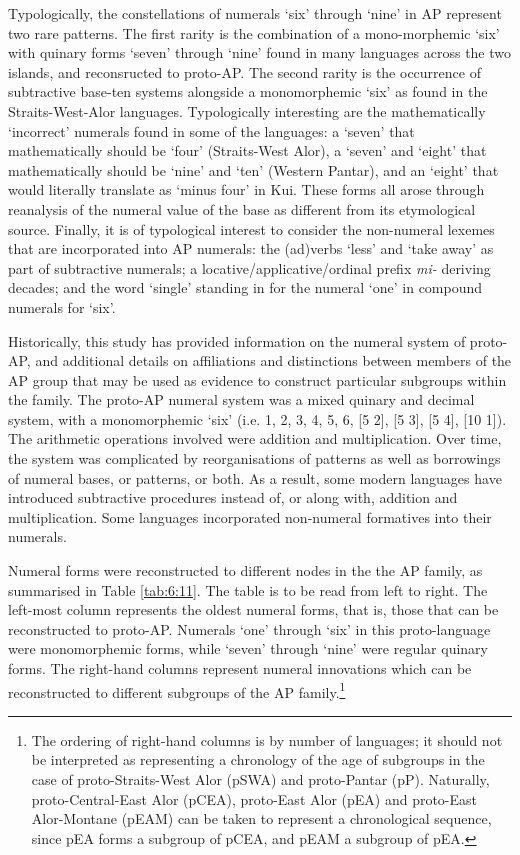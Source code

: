 \documentclass[output=paper]{LSP/langsci}
\begin{document}
Typologically, the constellations of numerals `six' through `nine' in AP represent two rare patterns. The first rarity is the combination of a mono-morphemic `six' with quinary forms `seven' through `nine' found in many languages across the two islands, and reconsructed to proto-AP. The second rarity is the occurrence of subtractive base-ten systems alongside a monomorphemic `six' as found in the Straits-West-Alor languages. Typologically interesting are the mathematically `incorrect' numerals found in some of the languages: a `seven' that mathematically should be `four' (Straits-West Alor), a `seven' and `eight' that mathematically should be `nine' and `ten' (Western Pantar), and an `eight' that would literally translate as `minus four' in Kui. These forms all arose through reanalysis of the numeral value of the base as different from its etymological source. Finally, it is of typological interest to consider the non-numeral lexemes that are incorporated into AP numerals: the (ad)verbs `less' and `take away' as part of subtractive numerals; a locative/applicative/ordinal prefix \textit{mi-} deriving decades; and the word `single' standing in for the numeral `one' in compound numerals for `six'. 

Historically, this study has provided information on the numeral system of proto-AP, and additional details on affiliations and distinctions between members of the AP group that may be used as evidence to construct particular subgroups within the family. The proto-AP numeral system was a mixed quinary and decimal system, with a monomorphemic `six' (i.e. 1, 2, 3, 4, 5, 6, [5 2], [5 3], [5 4], [10 1]). The arithmetic operations involved were addition and multiplication. Over time, the system was complicated by reorganisations of patterns as well as borrowings of numeral bases, or patterns, or both. As a result, some modern languages have introduced subtractive procedures instead of, or along with, addition and multiplication. Some languages incorporated non-numeral formatives into their numerals. 

Numeral forms were reconstructed to different nodes in the the AP family, as summarised in Table \ref{tab:6:11}. The table is to be read from left to right. The left-most column represents the oldest numeral forms, that is, those that can be reconstructed to proto-AP. Numerals `one' through `six' in this proto-language were monomorphemic forms, while `seven' through `nine' were regular quinary forms. The right-hand columns represent numeral innovations which can be reconstructed to different subgroups of the AP family.\footnote{{}   The ordering of right-hand columns is by number of languages; it should not be interpreted as representing a chronology of the age of subgroups in the case of proto-Straits-West Alor (pSWA) and proto-Pantar (pP). Naturally, proto-Central-East Alor (pCEA), proto-East Alor (pEA) and proto-East Alor-Montane (pEAM) can be taken to represent a chronological sequence, since pEA forms a subgroup of pCEA, and pEAM a subgroup of pEA.} 
\end{document}
